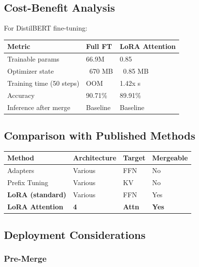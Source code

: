 \subsection{Cost-Benefit Analysis}

For DistilBERT fine-tuning:

\begin{table}[H]
\centering
\small
\begin{tabular}{lll}
\toprule
\textbf{Metric} & \textbf{Full FT} & \textbf{LoRA Attention} \\
\midrule
Trainable params & 66.9M & 0.85 \\
Optimizer state & ~670 MB & ~0.85 MB \\
Training time (50 steps) & OOM & 1.42x s \\
Accuracy & 90.71\% & 89.91\% \\
Inference after merge & Baseline & Baseline \\
\bottomrule
\end{tabular}
\end{table}

\subsection{Comparison with Published Methods}

\begin{table}[H]
\centering
\small
\begin{tabular}{llll}
\toprule
\textbf{Method} & \textbf{Architecture} & \textbf{Target} & \textbf{Mergeable} \\
\midrule
Adapters & Various & FFN & No \\
Prefix Tuning & Various & KV & No \\
\textbf{LoRA (standard)} & Various & FFN & Yes \\
\textbf{LoRA Attention} & \textbf{4} & \textbf{Attn} & \textbf{Yes} \\
\bottomrule
\end{tabular}
\end{table}

\subsection{Deployment Considerations}

\subsubsection{Pre-Merge}

